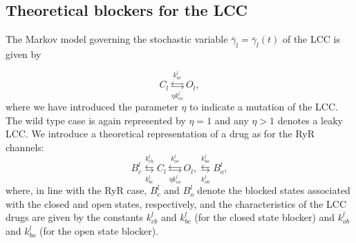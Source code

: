 \subsection{Theoretical blockers for the LCC}
The Markov model governing the stochastic variable $\bar{\gamma}
_{l}=\bar{\gamma}_{l}(t)$ of the LCC is given by

\begin{equation}
C_{l}\underset{\eta k_{co}^{l}}{\overset{k_{oc}^{l}}{\leftrightarrows}}
O_{l},\label{m_l2}
\end{equation}
where we have introduced the parameter $\eta$ to indicate a mutation of the
LCC. The wild type case is again represented by $\eta=1$ and any
$\eta>1$ denotes a leaky LCC. We introduce a theoretical representation
of a drug as for the RyR channels:
\begin{equation}
B_{c}^{l}\underset{k_{bc}^{l}}{\overset{k_{cb}^{l}}{\leftrightarrows}}
C_{l}\underset{\eta k_{co}^{l}}{\overset{k_{oc}^{l}}{\leftrightarrows}}
O_{l},\underset{k_{ob}^{l}}{\overset{k_{bo}^{l}}{\leftrightarrows}}B_{o}
^{l}, \label{m_l2d}
\end{equation}
where, in line with the RyR case, $B_{c}^{l}$ and $B_{o}^{l}$ denote the
blocked states associated with the closed and open states, respectively, and the
characteristics of the LCC drugs are given by the constants
$k_{cb}^{l}$ and $k_{bc}^{l}$ (for the closed state blocker)
and $k_{ob}^{l}$ and $k_{bo}^{l}$ (for the open state blocker).

